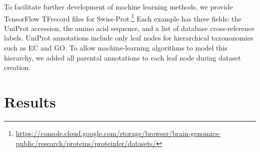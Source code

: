 To facilitate further development of machine learning methods, we provide TensorFlow \citep{abadi2016tensorflow} TFrecord files for Swiss-Prot.\footnote{\url{https://console.cloud.google.com/storage/browser/brain-genomics-public/research/proteins/proteinfer/datasets/}} Each example has three fields: the UniProt accession, the amino acid sequence, and a list of database cross-reference labels. UniProt annotations include only leaf nodes for hierarchical taxononomies such as EC and GO. To allow machine-learning algorithms to model this hierarchy, we added all parental annotations to each leaf node during dataset creation. 


\section*{Results}


